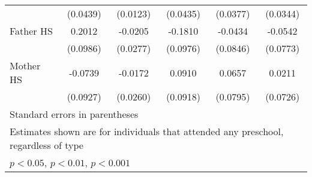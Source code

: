 \begin{table}[htbp]
\begin{tabular}{l*{5}{c}}
            &    (0.0439)         &    (0.0123)         &    (0.0435)         &    (0.0377)         &    (0.0344)         \\
\addlinespace
Father HS   &      0.2012\sym{*}  &     -0.0205         &     -0.1810         &     -0.0434         &     -0.0542         \\
            &    (0.0986)         &    (0.0277)         &    (0.0976)         &    (0.0846)         &    (0.0773)         \\
\addlinespace
Mother HS   &     -0.0739         &     -0.0172         &      0.0910         &      0.0657         &      0.0211         \\
            &    (0.0927)         &    (0.0260)         &    (0.0918)         &    (0.0795)         &    (0.0726)         \\
\bottomrule
\multicolumn{6}{l}{\footnotesize Standard errors in parentheses}\\
\multicolumn{6}{l}{\footnotesize Estimates shown are for individuals that attended any preschool, regardless of type}\\
\multicolumn{6}{l}{\footnotesize \sym{*} \(p<0.05\), \sym{**} \(p<0.01\), \sym{***} \(p<0.001\)}\\
\end{tabular}
\end{table}
